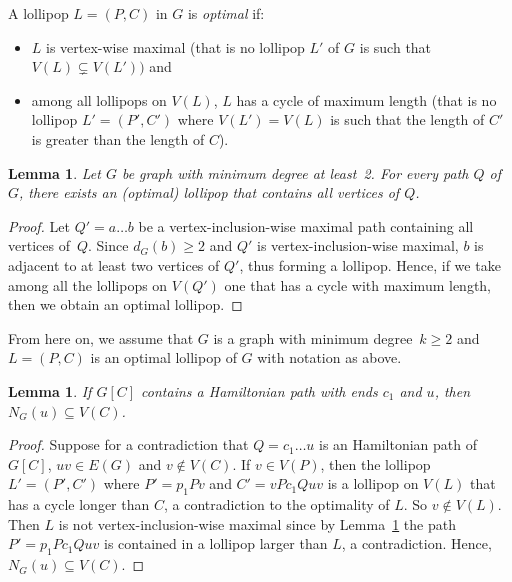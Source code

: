 \documentclass[11pt]{article}
\newtheorem{lemma}[theo]{Lemma}
\begin{document}
A lollipop $L=(P, C)$ in $G$ is \emph{optimal} if: 
\begin{itemize}
    \item $L$ is vertex-wise maximal (that is no lollipop $L'$ of $G$ is such that $V(L) \subsetneq V(L'))$ and 
    \item among all lollipops on $V(L)$, $L$ has a cycle of maximum length (that is no lollipop $L' = (P', C')$ where $V(L')=V(L)$ is such that the length of $C'$ is greater than the length of $C$).  
\end{itemize}

\begin{lemma}
 \label{l:contain}
 Let $G$ be graph with minimum degree at least~2.  For every path $Q$ of $G$, there exists an (optimal) lollipop  that contains all vertices of $Q$. 
\end{lemma}

\begin{proof}
    Let $Q'= a\dots b$ be a vertex-inclusion-wise maximal path containing all vertices of~$Q$.  Since $d_G(b)\geq 2$ and $Q'$ is vertex-inclusion-wise maximal, $b$ is adjacent to at least two vertices of $Q'$, thus forming a lollipop.  Hence, if we take among all the lollipops on $V(Q')$ one that has a cycle with maximum length, then we obtain an optimal lollipop.
\end{proof}

\vspace{0.4cm}

From here on, we assume that $G$ is a graph with minimum degree~$k\geq 2$ and 
$L = (P, C)$ is an optimal lollipop of $G$ with notation as above. 

\begin{lemma}\label{lem:activeneighborhood}
 If $G[C]$ contains a Hamiltonian path with ends $c_1$ and $u$, then $N_G(u) \subseteq V(C)$. 
\end{lemma}

\begin{proof}
    Suppose for a contradiction that $Q = c_1\dots u$ is an Hamiltonian path of $G[C]$, $uv\in E(G)$ and $v\notin V(C)$. If $v\in V(P)$, then the lollipop $L'=(P', C')$ where $P'=p_1 P v$ and $C'= v P c_1 Q u v$ is a lollipop on $V(L)$ that has a cycle longer than $C$, a contradiction to the optimality of $L$. So $v\notin V(L)$. Then $L$ is not vertex-inclusion-wise maximal since by Lemma~\ref{l:contain} the path $P'=p_1Pc_1Quv$ is contained in a lollipop larger than $L$, a contradiction. Hence, $N_G(u) \subseteq V(C)$.
\end{proof}
\end{document}
